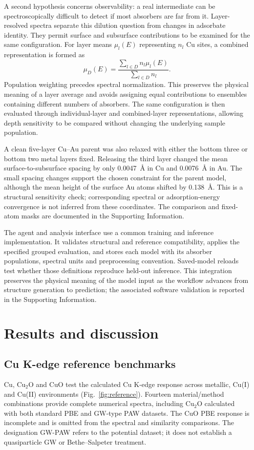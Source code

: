 \documentclass[11pt,a4paper]{article}
\begin{document}
A second hypothesis concerns observability: a real intermediate can be spectroscopically difficult to detect if most absorbers are far from it. Layer-resolved spectra separate this dilution question from changes in adsorbate identity. They permit surface and subsurface contributions to be examined for the same configuration. For layer means $\mu_l(E)$ representing $n_l$ Cu sites, a combined representation is formed as
\begin{equation}
\mu_D(E)=\frac{\sum_{l\in D}n_l\mu_l(E)}{\sum_{l\in D}n_l}.
\label{eq:average}
\end{equation}
Population weighting precedes spectral normalization. This preserves the physical meaning of a layer average and avoids assigning equal contributions to ensembles containing different numbers of absorbers. The same configuration is then evaluated through individual-layer and combined-layer representations, allowing depth sensitivity to be compared without changing the underlying sample population.


A clean five-layer Cu--Au parent was also relaxed with either the bottom three or bottom two metal layers fixed. Releasing the third layer changed the mean surface-to-subsurface spacing by only 0.0047~\AA{} in Cu and 0.0076~\AA{} in Au. The small spacing changes support the chosen constraint for the parent model, although the mean height of the surface Au atoms shifted by 0.138~\AA{}. This is a structural sensitivity check; corresponding spectral or adsorption-energy convergence is not inferred from these coordinates. The comparison and fixed-atom masks are documented in the Supporting Information.

The agent and analysis interface use a common training and inference implementation. It validates structural and reference compatibility, applies the specified grouped evaluation, and stores each model with its absorber populations, spectral units and preprocessing convention. Saved-model reloads test whether those definitions reproduce held-out inference. This integration preserves the physical meaning of the model input as the workflow advances from structure generation to prediction; the associated software validation is reported in the Supporting Information.

\section{Results and discussion}
\subsection{Cu K-edge reference benchmarks}
Cu, Cu$_2$O and CuO test the calculated Cu K-edge response across metallic, Cu(I) and Cu(II) environments (Fig.~\ref{fig:reference}). Fourteen material/method combinations provide complete numerical spectra, including Cu$_2$O calculated with both standard PBE and GW-type PAW datasets. The CuO PBE response is incomplete and is omitted from the spectral and similarity comparisons. The designation GW-PAW refers to the potential dataset; it does not establish a quasiparticle GW or Bethe--Salpeter treatment.
\end{document}
